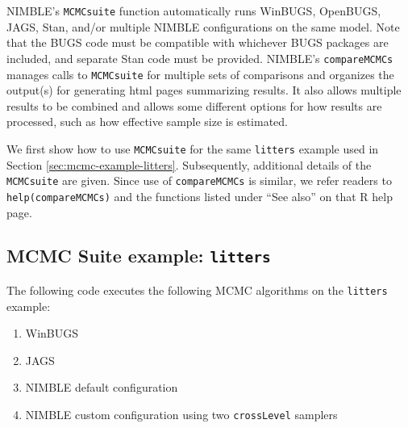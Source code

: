 \documentclass[12pt,oneside]{book}\usepackage[]{graphicx}\usepackage[]{color}
\def\cd#1{\texttt{#1}}
\begin{document}
NIMBLE's \cd{MCMCsuite} function automatically runs WinBUGS, OpenBUGS, JAGS, Stan, and/or multiple NIMBLE configurations on the same model.  Note that the BUGS code must be compatible with whichever BUGS packages are included, and separate Stan code must be provided.  NIMBLE's \cd{compareMCMCs} manages calls to \cd{MCMCsuite} for multiple sets of comparisons and organizes the output(s) for generating html pages summarizing results.  It also allows multiple results to be combined and allows some different options for how results are processed, such as how effective sample size is estimated.

We first show how to use \cd{MCMCsuite} for the same \cd{litters} example used in Section \ref{sec:mcmc-example-litters}.  Subsequently, additional details of the \cd{MCMCsuite} are given.  Since use of \cd{compareMCMCs} is similar, we refer readers to \cd{help(compareMCMCs)} and the functions listed under ``See also'' on that R help page.

\subsection{MCMC Suite example: \cd{litters}}

The following code executes the following MCMC algorithms on the \cd{litters} example:
\begin{enumerate}
\item WinBUGS
\item JAGS
\item NIMBLE default configuration
\item NIMBLE custom configuration using two \cd{crossLevel} samplers
\end{enumerate}
\end{document}

